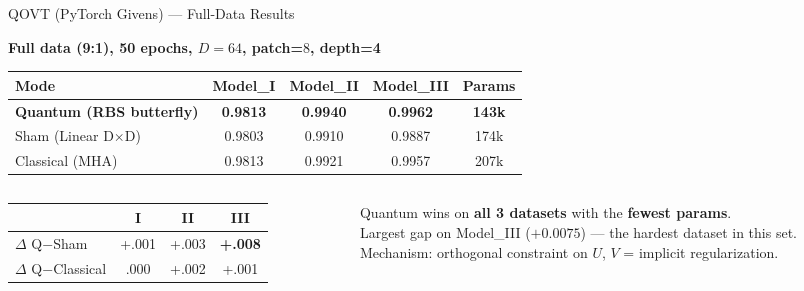 \documentclass[aspectratio=169]{beamer}
\newcommand{\win}[1]{\textcolor{good}{\textbf{#1}}}
\newcommand{\qs}[1]{\textcolor{q}{\textbf{#1}}}
\begin{document}
\begin{frame}{QOVT (PyTorch Givens) --- Full-Data Results}

\textbf{Full data (9:1), 50 epochs, $D=64$, patch=$8$, depth=4}

\bigskip
\begin{tabular}{@{}lcccc@{}}
\toprule
Mode & Model\_I & Model\_II & Model\_III & Params \\
\midrule
\rowcolor{rowhi}
\qs{Quantum (RBS butterfly)} & \win{0.9813} & \win{0.9940} & \win{0.9962} & \win{143k} \\
Sham (Linear D$\times$D) & 0.9803 & 0.9910 & 0.9887 & 174k \\
Classical (MHA) & 0.9813 & 0.9921 & 0.9957 & 207k \\
\bottomrule
\end{tabular}

\bigskip
\begin{columns}
\begin{column}{0.45\textwidth}
\small
\begin{tabular}{@{}lccc@{}}
\toprule
 & I & II & III \\
\midrule
$\Delta$ Q$-$Sham & +.001 & +.003 & \win{+.008} \\
$\Delta$ Q$-$Classical & .000 & +.002 & +.001 \\
\bottomrule
\end{tabular}
\end{column}
\begin{column}{0.52\textwidth}
\small
Quantum wins on \textbf{all 3 datasets} with the \textbf{fewest params}.\\[4pt]
Largest gap on Model\_III ($+0.0075$) --- the hardest dataset in this set.\\[4pt]
Mechanism: orthogonal constraint on $U$, $V$ = implicit regularization.
\end{column}
\end{columns}
\end{frame}
\end{document}
